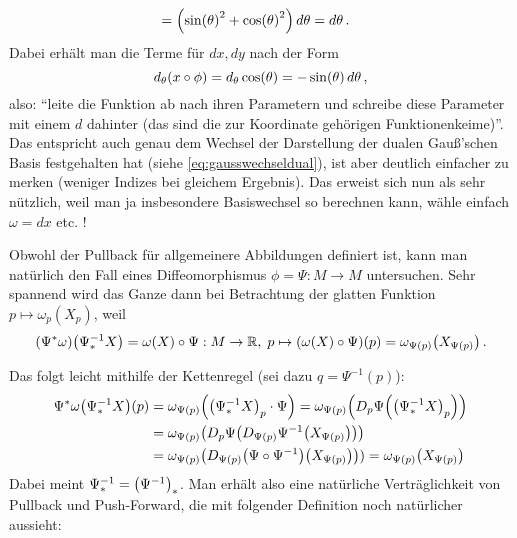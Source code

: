 \documentclass[../H_Analysis_main.tex]{subfiles}
\begin{document}
\begin{bsp}
\begin{align}
\notag\\
&= \qty(\sin(\theta)^2 + \cos(\theta)^2) \, d\theta = d\theta \, .
\end{align}
Dabei erhält man die Terme für $dx, dy$ nach der Form
\begin{equation*}
d_\theta \qty(x \circ \phi) = d_\theta \cos(\theta) = -\sin(\theta) \, d\theta \, ,
\end{equation*}
also: \enquote{leite die Funktion ab nach ihren Parametern und schreibe diese Parameter mit einem $d$ dahinter (das sind die zur Koordinate gehörigen Funktionenkeime)}. Das entspricht auch genau dem Wechsel der Darstellung der dualen Gauß'schen Basis festgehalten hat (siehe \eqref{eq:gausswechseldual}), ist aber deutlich einfacher zu merken (weniger Indizes bei gleichem Ergebnis). Das erweist sich nun als sehr nützlich, weil man ja insbesondere Basiswechsel so berechnen kann, wähle einfach $\omega = dx$ etc. !
\end{bsp}


Obwohl der Pullback für allgemeinere Abbildungen definiert ist, kann man natürlich den Fall eines Diffeomorphismus $\phi = \Psi: M \rightarrow M$ untersuchen. Sehr spannend wird das Ganze dann bei Betrachtung der glatten Funktion $p \mapsto \omega_p(X_p)$, weil
\begin{equation}\label{eq:pullpushv1}
\qty(\Psi^* \omega)\qty(\Psi^{-1}_* X) = \omega(X) \circ \Psi: M \rightarrow \mathbb{R}, \; p \mapsto \qty(\omega(X) \circ \Psi)(p) = \omega_{\Psi(p)}\qty(X_{\Psi(p)}) \, .
\end{equation}

Das folgt leicht mithilfe der Kettenregel (sei dazu $q = \Psi^{-1}(p)$):
\begin{align*}
\Psi^*\omega\qty(\Psi^{-1}_* X)(p) &= \omega_{\Psi(p)}\qty(\qty(\Psi^{-1}_* X)_p \cdot \Psi) = \omega_{\Psi(p)}\qty(D_p \Psi \qty(\qty(\Psi^{-1}_* X)_p))
\\
&= \omega_{\Psi(p)}\qty(D_p \Psi \qty(D_{\Psi(p)} \Psi^{-1}\qty(X_{\Psi(p)}))) 
\\
&= \omega_{\Psi(p)}\qty(D_{\Psi(p)} \qty(\Psi \circ \Psi^{-1}) \qty(X_{\Psi(p)}))) = \omega_{\Psi(p)}\qty(X_{\Psi(p)})
\end{align*}
Dabei meint $\Psi^{-1}_* = \qty(\Psi^{-1})_*$. Man erhält also eine natürliche Verträglichkeit von Pullback und Push-Forward, die mit folgender Definition noch natürlicher aussieht:
\end{document}
